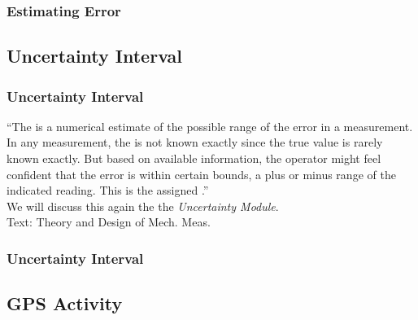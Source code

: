 \documentclass[fleqn]{beamer} %
\newcommand{\sectionIsubsectionIItitle}{Estimating Error}
\newcommand{\sectionIsubsectionIIItitle}{Uncertainty Interval}
\newcommand{\sectionIsubsectionIVtitle}{GPS Activity}
\begin{document}
			\begin{frame}
				\frametitle{\sectionIsubsectionIItitle}

				

			\end{frame}

			\begin{frame}

				


			\end{frame}


		\subsection{\sectionIsubsectionIIItitle}\label{sectionIsubsectionIII}
			\begin{frame} 
				\frametitle{\sectionIsubsectionIIItitle}
				``The \hspcu is a numerical estimate of the possible range of the error in a measurement. In any
				measurement, the \hspcu is not known exactly since the true value is rarely known exactly. But based on
				available information, the operator might feel confident that the error is within certain bounds, a plus
				or minus range of the indicated reading. This is the assigned \hspcu.''\vspace{5mm}\\
				We will discuss this again the the {\it Uncertainty Module}.\vspace{10mm}\\

				{\tiny Text: Theory and Design of Mech. Meas.}
				

			\end{frame}	

			\begin{frame} 
				\frametitle{\sectionIsubsectionIIItitle}

				
			\end{frame}	

		\subsection{\sectionIsubsectionIVtitle}\label{sectionIsubsectionIV}	
\end{document}
